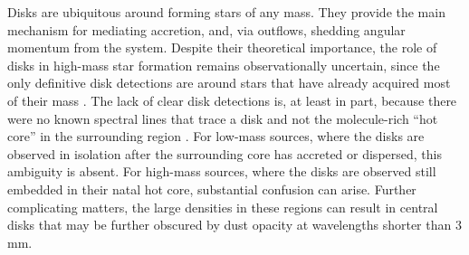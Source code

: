 \documentclass[12pt]{article}
\newcommand{\bam}[1]{\textcolor{green!65!black}{\textbf{[BAM: #1]}}}
\begin{document}

Disks are ubiquitous around forming stars of any mass.  They provide the main
mechanism for mediating accretion, and, via outflows, shedding angular momentum
from the system.  Despite their theoretical importance, the role of disks in
high-mass star formation remains observationally uncertain, since the only
definitive disk detections are around stars that have already acquired most of
their mass \cite{Girart2017a,Ginsburg2018b}.  The lack of clear disk detections
is, at least in part, because there were no known spectral lines that trace a
disk and not the molecule-rich ``hot core'' in the surrounding region
\cite{Goddi2018a,Cesaroni2017a}.  For low-mass sources, where the disks are
observed in isolation after the surrounding core has accreted or dispersed,
this ambiguity is absent.  For high-mass sources, where the disks are observed
still embedded in their natal hot core, substantial confusion can arise.
Further complicating matters, the large densities in these regions can result
in central disks that may be further obscured by dust opacity at wavelengths
shorter than 3 mm.

\end{document}
